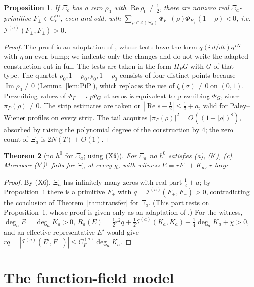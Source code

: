 \documentclass[11pt]{amsart}
\newtheorem{theorem}{Theorem}[section]
\newtheorem{proposition}[theorem]{Proposition}
\theoremstyle{definition}
\theoremstyle{remark}
\newcommand{\Rel}{\operatorname{Re}}
\newcommand{\Iml}{\operatorname{Im}}
\newcommand{\I}{\mathcal I}
\newcommand{\dg}{\deg}
\begin{document}
\begin{proposition}\label{prop:xiaF}
If $\Xi_a$ has a zero $\rho_0$ with $\Rel\rho_0\ne\frac12$, there are nonzero real $\Xi_a$-primitive
$F_\pm\in C_c^\infty$, even and odd, with $\sum_{\rho\in Z(\Xi_a)}\Phi_{F_\pm}(\rho)\Phi_{F_\pm}(1-\rho)<0$, i.e.
$\I^{(a)}(F_\pm,F_\pm)>0$.
\end{proposition}
\begin{proof}
The proof is an adaptation of \cite[Thm.~6.2]{Paper45}, whose tests have the form
$q(i\,d/dt)\eta^{\star N}$ with $\eta$ an even bump; we indicate only the changes and do not write the
adapted construction out in full. The tests are taken in the form $\Pi_PG$ with $G$ of that type. The quartet
$\rho_0,1-\rho_0,\bar\rho_0,1-\bar\rho_0$ consists of four distinct points because $\Iml\rho_0\ne0$ (Lemma~\ref{lem:PiP}),
which replaces the use of $\zeta(\sigma)\ne0$ on $(0,1)$. Prescribing values of $\Phi_F=\pi_P\Phi_G$ at zeros is
equivalent to prescribing $\Phi_G$, since $\pi_P(\rho)\ne0$. The strip estimates are taken on
$|\Rel s-\frac12|\le\frac12+a$, valid for Paley--Wiener profiles on every strip. The tail acquires
$|\pi_P(\rho)|^2=O((1+|\rho|)^8)$, absorbed by raising the polynomial degree of the construction by $4$;
the zero count of $\Xi_a$ is $2N(T)+O(1)$.
\end{proof}

\begin{theorem}[no $h^0$ for $\Xi_a$; using (X6)]\label{thm:xia-noh}
For $\Xi_a$ no $h^0$ satisfies (a), (b$'$), (c). Moreover (b$'$)$^+$ fails for $\Xi_a$ at every $\chi$, with witness
$E=rF_++K_a$, $r$ large.
\end{theorem}
\begin{proof}
By (X6), $\Xi_a$ has infinitely many zeros with real part $\frac12\pm a$; by Proposition~\ref{prop:xiaF} there is a
primitive $F_+$ with $q=\I^{(a)}(F_+,F_+)>0$, contradicting the conclusion of Theorem~\ref{thm:transfer} for
$\Xi_a$. (This part rests on Proposition~\ref{prop:xiaF}, whose proof is given only as an
adaptation of \cite[Thm.~6.2]{Paper45}.) For the witness, $\dg_aE=\dg_aK_a>0$, $R_a(E)=\frac12r^2q+\frac12\I^{(a)}(K_a,K_a)-\frac14\dg_aK_a+\chi>0$, and
an effective representative $E'$ would give $rq=|\I^{(a)}(E',F_+)|\le C^{(a)}_{F_+}\dg_aK_a$.
\end{proof}

\section{The function-field model}\label{sec:curve}
\end{document}
